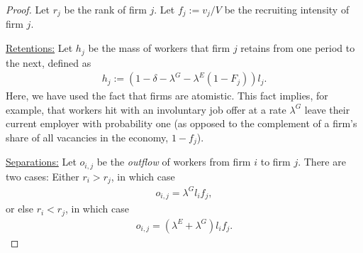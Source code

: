 \begin{proof}
    Let $r_{j}$ be the rank of firm $j$. %
    Let $f_{j} := v_{j}/V$ be the recruiting intensity of firm $j$.

    \underline{Retentions:} %
    Let $h_{j}$ be the mass of workers that firm $j$ retains from one period to the next, defined as
    \begin{align}
        h_{j} := \left(1 - \delta - \lambda^{G} - \lambda^{E} (1-F_{j})\right) l_{j} .
    \end{align}
    Here, we have used the fact that firms are atomistic. This fact implies, for example, that workers hit with an involuntary job offer at a rate $\lambda^{G}$ leave their current employer with probability one (as opposed to the complement of a firm's share of all vacancies in the economy, $1 - f_{j}$).


    \underline{Separations:} %
    Let $o_{i,j}$ be the \emph{outflow} of workers from firm $i$ to firm $j$. There are two cases: Either $r_{i} > r_{j}$, in which case
    \begin{align}
        o_{i,j} = \lambda^{G} l_{i} f_{j} ,
    \end{align}
    or else $r_{i} < r_{j}$, in which case
    \begin{align}
        o_{i,j} = (\lambda^{E} + \lambda^{G}) l_{i} f_{j} .
    \end{align}


\end{proof}
